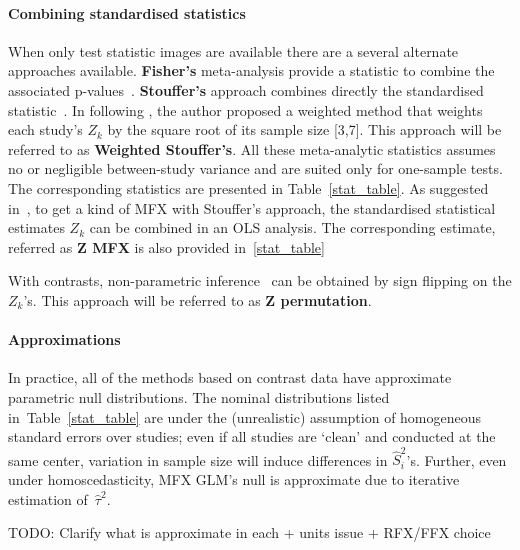 \documentclass[preprint]{elsarticle}
\newcommand{\vareffect}[1][i]{\hat S^2_{#1}}
\newcommand{\zeffect}[1][\studyidx]{Z_{#1}}
\newcommand{\studyidx}{k}
\newcommand{\estvarBetween}{\hat\tau^2}
\begin{document}
\paragraph{Combining standardised statistics} 
When only test statistic images are available there are a several alternate approaches available. \textbf{Fisher's} meta-analysis provide a statistic to combine the associated p-values~\cite{Fisher1932}. \textbf{Stouffer's} approach combines directly the standardised statistic~\cite{Stouffer1949}. In \cite{Zaykin2011} following \cite{Liptak1958}, the author proposed a weighted method that weights each study's $\zeffect$ by the square root of its sample size [3,7]. This approach will be referred to as \textbf{Weighted Stouffer's}. All these meta-analytic statistics assumes no or negligible between-study variance and are suited only for one-sample tests. The corresponding statistics are presented in Table~\ref{stat_table}.
As suggested in~\cite{Salimi-khorshidi2009}, to get a kind of MFX with Stouffer's approach, the standardised statistical estimates $\zeffect$ can be combined in an OLS analysis. The corresponding estimate, referred as \textbf{Z MFX} is also provided in~\ref{stat_table}

With contrasts, non-parametric inference~\cite{Holmes1996,Nichols2002} can be obtained by sign flipping on the $\zeffect$'s. This approach will be referred to as \textbf{Z permutation}.

\paragraph{Approximations}  In practice, all of the methods based on contrast data have approximate parametric null distributions.  The nominal distributions listed in~Table~\ref{stat_table} are under the (unrealistic) assumption of homogeneous standard errors over studies; even if all studies are `clean' and conducted at the same center, variation in sample size will induce differences in $\vareffect$'s.  Further, even under homoscedasticity, MFX GLM's null is approximate due to iterative estimation of~$\estvarBetween$.


TODO: Clarify what is approximate in each + units issue + RFX/FFX choice

\end{document}
